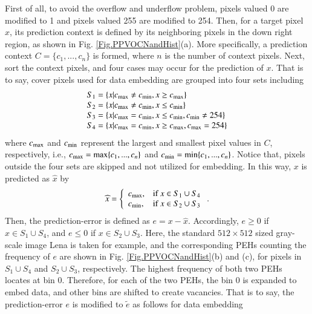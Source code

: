 \documentclass[review,3p,10pt,sort&compress]{elsarticle}
\begin{document}
First of all, to avoid the overflow and underflow problem, pixels valued 0 are modified to 1 and pixels valued 255 are modified to 254. Then, for a target pixel $x$, its prediction context is defined by its neighboring pixels in the down right region, as shown in Fig. \ref{Fig.PPVOCNandHist}(a). More specifically, a prediction context $C=\{c_1,...,c_n\}$ is formed, where $n$ is the number of context pixels.
Next, sort the context pixels, and four cases may occur for the prediction of $x$. That is to say, cover pixels used for data embedding are grouped into four sets including
\begin{equation}\label{eq:S}
\begin{array}{ll}
    S_1 = \{ x | c_{\rm max} \neq c_{\rm min}, x \geq c_{\rm max} \} \\
    S_2 = \{ x | c_{\rm max} \neq c_{\rm min}, x \leq c_{\rm min} \} \\
    S_3 = \{ x | c_{\rm max}   =  c_{\rm min}, x \leq c_{\rm min}, c_{\rm min} \neq 254 \} \\
    S_4 = \{ x | c_{\rm max}   =  c_{\rm min}, x \geq c_{\rm max}, c_{\rm max} =  254 \} \\
\end{array}
\end{equation}
where $c_{\rm max}$ and $c_{\rm min}$ represent the largest and smallest pixel values in $C$, respectively, i.e., $c_{\rm max} =\max\{c_1,...,c_n\}$ and $c_{\rm min} =\min\{c_1,...,c_n\}$. Notice that, pixels outside the four sets are skipped and not utilized for embedding. In this way, $x$ is predicted as $\widehat{x}$ by
\begin{equation}\label{eq:xhat1}
    \widehat{x} = \left\{\begin{array}{ll}
    c_{\rm max},  & \text{if } x \in S_1 \cup S_4 \\
    c_{\rm min},  & \text{if } x \in S_2 \cup S_3
\end{array}\right.
.
\end{equation}
Then, the prediction-error is defined as $e = x - \widehat{x}$. Accordingly, $e \geq 0$ if $x \in S_1 \cup S_4$, and $e \leq 0$ if $x \in S_2 \cup S_3$. Here, the standard $512 \times 512$ sized gray-scale image Lena is taken for example, and the corresponding PEHs counting the frequency of $e$ are shown in Fig. \ref{Fig.PPVOCNandHist}(b) and (c), for pixels in $S_1 \cup S_4$ and $S_2 \cup S_3$, respectively. The highest frequency of both two PEHs locates at bin 0. Therefore, for each of the two PEHs, the bin 0 is expanded to embed data, and other bins are shifted to create vacancies. That is to say, the prediction-error $e$ is modified to $\widetilde{e}$ as follows for data embedding
\end{document}
